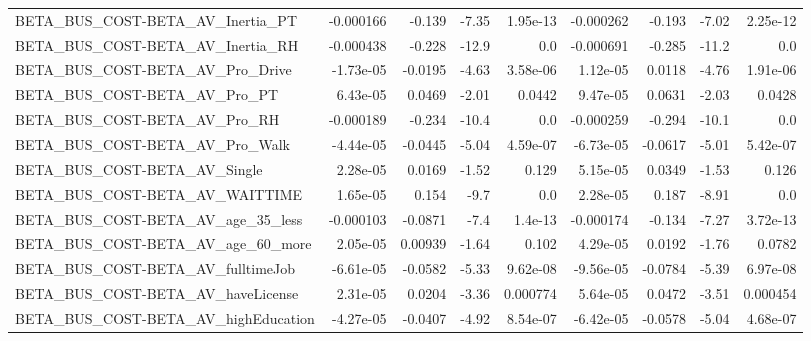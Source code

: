 \begin{tabular}{lrrrrrrrr}
BETA\_BUS\_COST-BETA\_AV\_Inertia\_PT                   &   -0.000166 &       -0.139 &    -7.35 & 1.95e-13 &  -0.000262 &      -0.193 &        -7.02 &      2.25e-12 \\
BETA\_BUS\_COST-BETA\_AV\_Inertia\_RH                   &   -0.000438 &       -0.228 &    -12.9 &      0.0 &  -0.000691 &      -0.285 &        -11.2 &           0.0 \\
BETA\_BUS\_COST-BETA\_AV\_Pro\_Drive                    &   -1.73e-05 &      -0.0195 &    -4.63 & 3.58e-06 &   1.12e-05 &      0.0118 &        -4.76 &      1.91e-06 \\
BETA\_BUS\_COST-BETA\_AV\_Pro\_PT                       &    6.43e-05 &       0.0469 &    -2.01 &   0.0442 &   9.47e-05 &      0.0631 &        -2.03 &        0.0428 \\
BETA\_BUS\_COST-BETA\_AV\_Pro\_RH                       &   -0.000189 &       -0.234 &    -10.4 &      0.0 &  -0.000259 &      -0.294 &        -10.1 &           0.0 \\
BETA\_BUS\_COST-BETA\_AV\_Pro\_Walk                     &   -4.44e-05 &      -0.0445 &    -5.04 & 4.59e-07 &  -6.73e-05 &     -0.0617 &        -5.01 &      5.42e-07 \\
BETA\_BUS\_COST-BETA\_AV\_Single                       &    2.28e-05 &       0.0169 &    -1.52 &    0.129 &   5.15e-05 &      0.0349 &        -1.53 &         0.126 \\
BETA\_BUS\_COST-BETA\_AV\_WAITTIME                     &    1.65e-05 &        0.154 &     -9.7 &      0.0 &   2.28e-05 &       0.187 &        -8.91 &           0.0 \\
BETA\_BUS\_COST-BETA\_AV\_age\_35\_less                  &   -0.000103 &      -0.0871 &     -7.4 &  1.4e-13 &  -0.000174 &      -0.134 &        -7.27 &      3.72e-13 \\
BETA\_BUS\_COST-BETA\_AV\_age\_60\_more                  &    2.05e-05 &      0.00939 &    -1.64 &    0.102 &   4.29e-05 &      0.0192 &        -1.76 &        0.0782 \\
BETA\_BUS\_COST-BETA\_AV\_fulltimeJob                  &   -6.61e-05 &      -0.0582 &    -5.33 & 9.62e-08 &  -9.56e-05 &     -0.0784 &        -5.39 &      6.97e-08 \\
BETA\_BUS\_COST-BETA\_AV\_haveLicense                  &    2.31e-05 &       0.0204 &    -3.36 & 0.000774 &   5.64e-05 &      0.0472 &        -3.51 &      0.000454 \\
BETA\_BUS\_COST-BETA\_AV\_highEducation                &   -4.27e-05 &      -0.0407 &    -4.92 & 8.54e-07 &  -6.42e-05 &     -0.0578 &        -5.04 &      4.68e-07 \\

\end{tabular}
